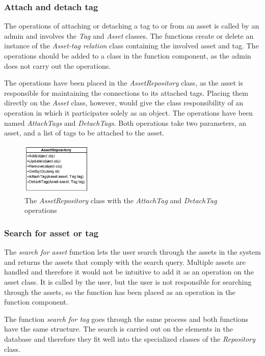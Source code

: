 \subsubsection{Attach and detach tag}
The operations of attaching or detaching a tag to or from an asset is called by an admin and involves the \textit{Tag} and \textit{Asset} classes. The functions create or delete an instance of the \textit{Asset-tag relation} class containing the involved asset and tag. The operations should be added to a class in the function component, as the admin does not carry out the operations.
\par
The operations have been placed in the \textit{AssetRepository} class, as the asset is responsible for maintaining the connections to its attached tags. Placing them directly on the \textit{Asset} class, however, would give the class responsibility of an operation in which it participates solely as an object. The operations have been named \textit{AttachTags} and \textit{DetachTags}. Both operations take two parameters, an asset, and a list of tags to be attached to the asset.

\begin{figure}[H]
    \centering
    \includegraphics[width=0.3\textwidth]{figures/FunctionComponent/AttachTag.png}
    \caption{The \textit{AssetRepository} class with the \textit{AttachTag} and \textit{DetachTag} operations}
    \label{fig:AttachDetachTag}
\end{figure}

\subsubsection{Search for asset or tag}
The \textit{search for asset} function lets the user search through the assets in the system and returns the assets that comply with the search query. Multiple assets are handled and therefore it would not be intuitive to add it as an operation on the asset class. It is called by the user, but the user is not responsible for searching through the assets, so the function has been placed as an operation in the function component.
\par
The function \textit{search for tag} goes through the same process and both functions have the same structure. The search is carried out on the elements in the database and therefore they fit well into the specialized classes of the \textit{Repository} class.

